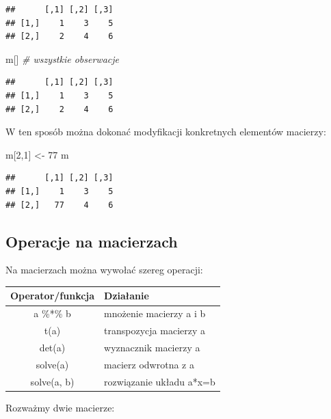 \documentclass[
]{book}
\newenvironment{Shaded}{\begin{snugshade}}{\end{snugshade}}
\newcommand{\CommentTok}[1]{\textcolor[rgb]{0.56,0.35,0.01}{\textit{#1}}}
\newcommand{\DecValTok}[1]{\textcolor[rgb]{0.00,0.00,0.81}{#1}}
\newcommand{\NormalTok}[1]{#1}
\newcommand{\OtherTok}[1]{\textcolor[rgb]{0.56,0.35,0.01}{#1}}
\begin{document}
\begin{verbatim}
##      [,1] [,2] [,3]
## [1,]    1    3    5
## [2,]    2    4    6
\end{verbatim}

\begin{Shaded}
\begin{Highlighting}[]
\NormalTok{m[]    }\CommentTok{\# wszystkie obserwacje}
\end{Highlighting}
\end{Shaded}

\begin{verbatim}
##      [,1] [,2] [,3]
## [1,]    1    3    5
## [2,]    2    4    6
\end{verbatim}

W ten sposób można dokonać modyfikacji konkretnych elementów macierzy:

\begin{Shaded}
\begin{Highlighting}[]
\NormalTok{m[}\DecValTok{2}\NormalTok{,}\DecValTok{1}\NormalTok{] }\OtherTok{\textless{}{-}} \DecValTok{77}
\NormalTok{m}
\end{Highlighting}
\end{Shaded}

\begin{verbatim}
##      [,1] [,2] [,3]
## [1,]    1    3    5
## [2,]   77    4    6
\end{verbatim}

\hypertarget{operacje-na-macierzach}{%
\subsection{Operacje na macierzach}\label{operacje-na-macierzach}}

Na macierzach można wywołać szereg operacji:

\begin{longtable}[]{@{}cl@{}}
\toprule
Operator/funkcja & Działanie \\
\midrule
\endhead
a \%*\% b & mnożenie macierzy a i b \\
t(a) & transpozycja macierzy a \\
det(a) & wyznacznik macierzy a \\
solve(a) & macierz odwrotna z a \\
solve(a, b) & rozwiązanie układu a*x=b \\
\bottomrule
\end{longtable}

Rozważmy dwie macierze:
\end{document}
